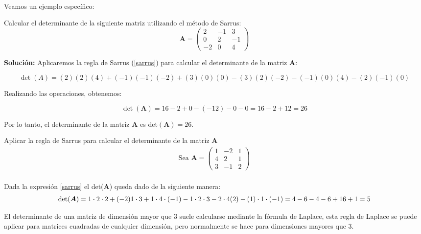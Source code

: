 \begin{}
Veamos un ejemplo específico:
\begin{example}
Calcular el determinante de la siguiente matriz utilizando el método de Sarrus:
\[ \boldsymbol{A} = \begin{pmatrix} 2 & -1 & 3 \\ 0 & 2 & -1 \\ -2 & 0 & 4 \end{pmatrix} \]

\textbf{Solución:}
Aplicaremos la regla de Sarrus (\ref{sarrus}) para calcular el determinante de la matriz \( \boldsymbol{A} \):

\[
\det(A) = (2)(2)(4) + (-1)(-1)(-2) + (3)(0)(0) - (3)(2)(-2) - (-1)(0)(4) - (2)(-1)(0)
\]

Realizando las operaciones, obtenemos:

\[
\det(\boldsymbol{A}) = 16 - 2 + 0 - (-12) - 0 - 0 = 16 -2  + 12 = 26
\]

Por lo tanto, el determinante de la matriz \( \boldsymbol{A} \) es \( \text{det}(\boldsymbol{A}) = 26 \).
\end{example}


\begin{exercise}
Aplicar la regla de Sarrus para calcular el determinante de la matriz $\boldsymbol{A}$
 $$\begin{aligned}
   \text{Sea} \,\,\boldsymbol{A}=\left(\begin{array}{ccc}
1 & -2 & 1 \\
4 & 2 & 1 \\
3 & -1 & 2
\end{array}\right)\\  
 \end{aligned}$$   
\end{exercise}

\begin{solution}
Dada la expresión \ref{sarrus} el det($\boldsymbol{A}$) queda dado de la siguiente manera:\\
\[\text{det}(\boldsymbol{A})=1 \cdot 2 \cdot 2+(-2) 1 \cdot 3+1 \cdot4 \cdot( -1)-1\cdot2\cdot3-2 \cdot 4(2)-(1) \cdot 1 \cdot(- 1)\\
 =4-6-4-6+16+1\\
 =5
 \]    
\end{solution}
    





El determinante de una matriz de dimensión mayor que 3 suele calcularse mediante la fórmula de Laplace, esta regla de Laplace  se puede aplicar para matrices cuadradas de cualquier dimensión, pero normalmente se hace para dimensiones mayores que 3.


\end{}
